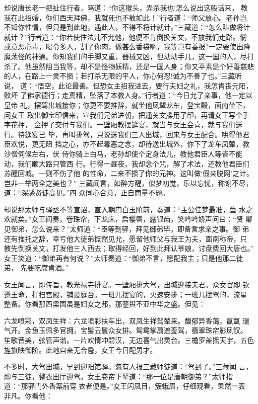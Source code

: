 却说唐长老一把扯住行者，骂道：“你这猴头，弄杀我也!怎么说出这般话来，
教我在此招婚，你们西天拜佛，我就死也不敢如此！”行者道：“师父放心。老孙岂
不知你性情，但只是到此地，遇此人，不得不将计就计。”三藏道：“怎么叫做将计
就计？”行者道：“你若使住法儿不允他，他便不肯倒换关文，不放我们走路。倘
或意恶心毒，喝令多人，割了你肉，做甚么香袋啊，我等岂有善报?一定要使出降
魔荡怪的神通。你知我们的手脚又重，器械又凶，但动动手儿，这一国的人，尽打
杀了。他虽然阻当我等，却不是怪物妖精，还是一国人身；你又平素是个好善慈悲
的人，在路上一灵不损；若打杀无限的平人，你心何忍!诚为不善了也。”三藏听说，
道：“悟空，此论最善。但恐女主招我进去，要行夫妇之礼，我怎肯丧元阳，败坏
了佛家德行；走真精，坠落了本教人身。”行者道：“今日允了亲事，他一定以皇帝
礼，摆驾出城接你；你更不要推辞，就坐他凤辇龙车，登宝殿，面南坐下，问女王
取出御宝印信来，宣我们兄弟进朝，把通关文牒用了印，再请女王写个手字花押，
佥押了交付与我们。一壁厢教摆筵宴，就当与女王会喜，就与我们送行。待筵宴已
毕，再叫排驾，只说送我们三人出城，回来与女王配合。哄得他君臣欢悦，更无阻
挡之心，亦不起毒恶之念，却待送出城外，你下了龙车凤辇，教沙僧伺候左右，伏
侍你骑上白马，老孙却使个定身法儿，教他君臣人等皆不能动，我们顺大路只管西
行。行得一昼夜，我却念个咒，解了术法，还教他君臣们苏醒回城。一则不伤了他
的性命，二来不损了你的元神。这叫做‘假亲脱网’之计。岂非一举两全之美也？”
三藏闻言，如醉方醒，似梦初觉，乐以忘忧，称谢不尽，道：“深感贤徒高见。”四
众同心合意，正自商量不题。

却说那太师与驿丞不等宣诏，直入朝门白玉阶前，奏道：“主公佳梦最准，鱼
水之欢就矣。”女王闻奏，卷珠帘，下龙床，启樱唇，露银齿，笑吟吟娇声问曰：“贤
卿见御弟，怎么说来？”太师道：“臣等到驿，拜见御弟毕，即备言求亲之事。御
弟还有推托之辞，幸亏他大徒弟慨然见允，愿留他师父与我王为夫，面南称帝，只
教先倒换关文，打发他三人西去；取得经回，好到此拜认爷娘，讨盘费回大唐也。”
女王笑道：“御弟再有何说？”太师奏道：“御弟不言，愿配我主；只是他那二徒弟，
先要吃席肯酒。”

女王闻言，即传旨，教光禄寺排宴。一壁厢排大驾，出城迎接夫君。众女官即
钦遵王命，打扫宫殿，铺设庭台。一班儿摆宴的，火速安排；一班儿摆驾的，流星
整备。你看那西梁国虽是妇女之邦，那銮舆不亚中华之盛。但见：

六龙喷彩，双凤生祥：六龙喷彩扶车出，双凤生祥驾辇来。馥郁异香蔼，氤氲
瑞气开。金鱼玉佩多官拥，宝髻云鬟众女排。鸳鸯掌扇遮銮驾，翡翠珠帘影凤钗。
笙歌音美，弦管声谐。一片欢情冲碧汉，无边喜气出灵台。三檐罗盖摇天宇，五色
旌旗映御阶。此地自来无合卺，女王今日配男才。

不多时，大驾出城，早到迎阳馆驿。忽有人报三藏师徒道：“驾到了。”三藏闻
言，即与三徒，整衣出厅迎驾。女王卷帘下辇道：“那一位是唐朝御弟？”太师指
道：“那驿门外香案前穿衣者便是。”女王闪凤目，簇蛾眉，仔细观看，果然一表
非凡。你看他：

